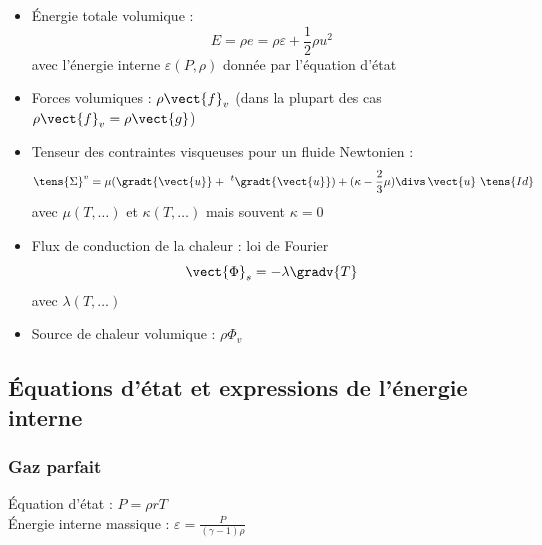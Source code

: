 \begin{itemize}

\item{Énergie totale volumique :
        \begin{equation}
        E = \rho e = \rho\varepsilon + \frac{1}{2} \rho u^2
        \end{equation}
        avec l'énergie interne $\varepsilon(P,\rho)$ donnée par l'équation d'état}
\\
\item{Forces volumiques : $\rho\vect{f}_v$ (dans la plupart des cas
                                            $\rho\vect{f}_v= \rho\vect{g}$)}
\\
\item{Tenseur des contraintes visqueuses pour un fluide Newtonien :
        \begin{equation}
        \tens{\Sigma}^v = \mu (\gradt{\vect{u}} +\ ^t\gradt{\vect{u}})
        + (\kappa - \frac{2}{3}\mu) \divs\,{\vect{u}}\ \tens{Id}
        \end{equation}
        avec $\mu(T,\ldots)$ et $\kappa(T,\ldots)$ mais souvent $\kappa =0$}
\\
\item{Flux de conduction de la chaleur : loi de Fourier
        \begin{equation}
        \vect{\Phi}_s = -\lambda \gradv{T}
        \end{equation}
        avec $\lambda(T,\ldots)$}
\\
\item{Source de chaleur volumique : $\rho\Phi_v$}

\end{itemize}


\subsection*{Équations d'état et expressions de l'énergie interne}
\label{Cfbl_Cfbase_equations_etat_cfbase}

\subsubsection*{Gaz parfait}

Équation d'état : $P = \rho r T$\\


Énergie interne massique :
$\varepsilon = \displaystyle\frac{P}{(\gamma -1) \rho}$

